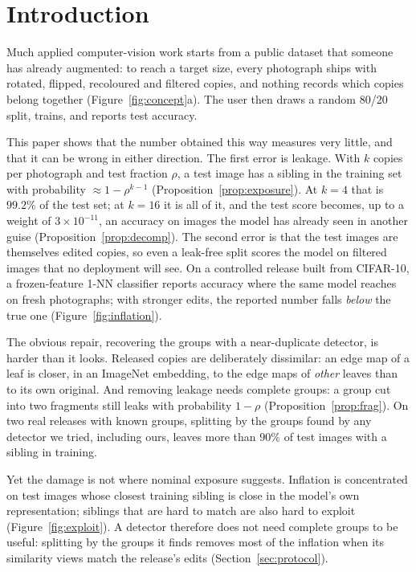\section{Introduction}
\label{sec:intro}

Much applied computer-vision work starts from a public dataset that someone has already augmented: to reach a target size, every photograph ships with rotated, flipped, recoloured and filtered copies, and nothing records which copies belong together (Figure~\ref{fig:concept}a). The user then draws a random 80/20 split, trains, and reports test accuracy.

This paper shows that the number obtained this way measures very little, and that it can be wrong in either direction. The first error is leakage. With $k$ copies per photograph and test fraction $\rho$, a test image has a sibling in the training set with probability $\approx1-\rho^{k-1}$ (Proposition~\ref{prop:exposure}). At $k=4$ that is $99.2\%$ of the test set; at $k=16$ it is all of it, and the test score becomes, up to a weight of $3\times10^{-11}$, an accuracy on images the model has already seen in another guise (Proposition~\ref{prop:decomp}). The second error is that the test images are themselves edited copies, so even a leak-free split scores the model on filtered images that no deployment will see. On a controlled release built from CIFAR-10, a frozen-feature 1-NN classifier reports \numWeakKnnRep{} accuracy where the same model reaches \numWeakKnnFresh{} on fresh photographs; with stronger edits, the reported number falls \emph{below} the true one (Figure~\ref{fig:inflation}).

The obvious repair, recovering the groups with a near-duplicate detector, is harder than it looks. Released copies are deliberately dissimilar: an edge map of a leaf is closer, in an ImageNet embedding, to the edge maps of \emph{other} leaves than to its own original. And removing leakage needs complete groups: a group cut into two fragments still leaks with probability $1-\rho$ (Proposition~\ref{prop:frag}). On two real releases with known groups, splitting by the groups found by any detector we tried, including ours, leaves more than $90\%$ of test images with a sibling in training.

Yet the damage is not where nominal exposure suggests. Inflation is concentrated on test images whose closest training sibling is close in the model's own representation; siblings that are hard to match are also hard to exploit (Figure~\ref{fig:exploit}). A detector therefore does not need complete groups to be useful: splitting by the groups it finds removes most of the inflation when its similarity views match the release's edits (Section~\ref{sec:protocol}).

